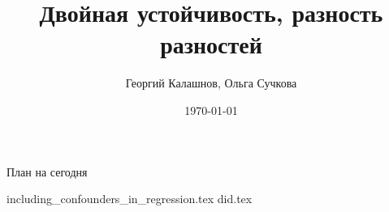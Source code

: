 \documentclass[handout,12pt]{beamer}
\title{Двойная устойчивость, разность разностей}
\author[Георгий Калашнов, Ольга Сучкова]{Георгий Калашнов, Ольга Сучкова}
\date{\today}
\begin{document}
\begin{frame}
  \titlepage
  
\end{frame}


\begin{frame}{План на сегодня} 
\tableofcontents
\end{frame}

{including_confounders_in_regression.tex}
{did.tex}
\end{document}
